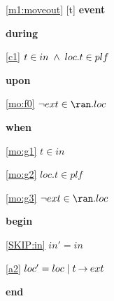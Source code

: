 \noindent \ref{m1:moveout} [t] \textbf{event}
\begin{block}
\item \textbf{during}
\begin{block}
\item[ \eqref{c1} ]$t \in in  %
		\1\land loc.t \in plf $ %
\end{block}
\item \textbf{upon}
\begin{block}
\item[ \eqref{mo:f0} ]$\neg ext \in \ran. loc $ %
\end{block}
\item \textbf{when}
\begin{block}
\item[ \eqref{mo:g1} ]$t \in in $ %
\item[ \eqref{mo:g2} ]$loc.t \in plf $ %
\item[ \eqref{mo:g3} ]$\neg ext \in \ran. loc $ %
\end{block}
\item \textbf{begin}
\begin{block}
\item[ \eqref{SKIP:in} ]$in' = in$ %
\item[ \eqref{a2} ]$loc' = loc \; | \; t \mathbin\rightarrow ext $ %
\end{block}
\item \textbf{end} \\
\end{block}
